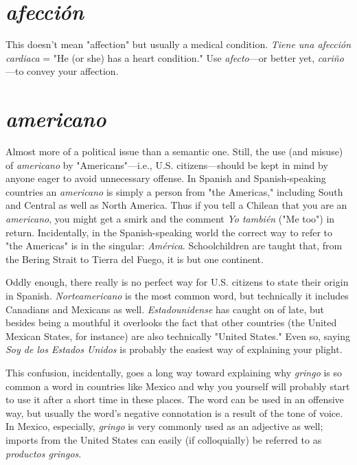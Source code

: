 \documentclass[14pt,a4paper,oneside]{memoir}
\begin{document}
\section{\emph{afección}}

This doesn't mean "affection" but usually a
medical condition. \emph{Tiene una afección cardiaca} = "He (or she) has a
heart condition." Use \emph{afecto}---or better yet, \emph{cariño}---to convey your
affection.

\section{\emph{americano}}

Almost more of a political issue than a semantic one. Still, the use (and misuse) of \emph{americano} by "Americans"---i.e.,
U.S. citizens---should be kept in mind by anyone eager to avoid unnecessary offense. In Spanish and Spanish-speaking countries an \emph{americano} is simply a person from "the Americas," including South and
Central as well as North America. Thus if you tell a Chilean that you
are an \emph{americano}, you might get a smirk and the comment \emph{Yo también} ("Me too") in return. Incidentally, in the Spanish-speaking world
the correct way to refer to "the Americas" is in the singular: \emph{América}.
Schoolchildren are taught that, from the Bering Strait to Tierra del
Fuego, it is but one continent.

Oddly enough, there really is no perfect way for U.S. citizens
to state their origin in Spanish. \emph{Norteamericano} is the most common
word, but technically it includes Canadians and Mexicans as well. \emph{Estadounidense} has caught on of late, but besides being a mouthful it
overlooks the fact that other countries (the United Mexican States, for
instance) are also technically "United States." Even so, saying \emph{Soy de
	los Estados Unidos} is probably the easiest way of explaining your
plight.

This confusion, incidentally, goes a long way toward explaining why \emph{gringo} is so common a word in countries like Mexico and why
you yourself will probably start to use it after a short time in these
places. The word can be used in an offensive way, but usually the
word's negative connotation is a result of the tone of voice. In Mexico,
especially, \emph{gringo} is very commonly used as an adjective as well; imports from the United States can easily (if colloquially) be referred to
as \emph{productos gringos}.
\end{document}
